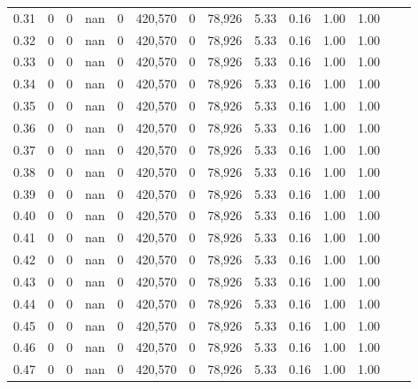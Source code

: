\begin{tabular}{rrrrrrrrrrrrrr}
0.31 &        0 &       0 &     nan &        0 &  420,570 &       0 &  78,926 &  5.33 &  0.16 &  1.00 &      1.00 \\
0.32 &        0 &       0 &     nan &        0 &  420,570 &       0 &  78,926 &  5.33 &  0.16 &  1.00 &      1.00 \\
0.33 &        0 &       0 &     nan &        0 &  420,570 &       0 &  78,926 &  5.33 &  0.16 &  1.00 &      1.00 \\
0.34 &        0 &       0 &     nan &        0 &  420,570 &       0 &  78,926 &  5.33 &  0.16 &  1.00 &      1.00 \\
0.35 &        0 &       0 &     nan &        0 &  420,570 &       0 &  78,926 &  5.33 &  0.16 &  1.00 &      1.00 \\
0.36 &        0 &       0 &     nan &        0 &  420,570 &       0 &  78,926 &  5.33 &  0.16 &  1.00 &      1.00 \\
0.37 &        0 &       0 &     nan &        0 &  420,570 &       0 &  78,926 &  5.33 &  0.16 &  1.00 &      1.00 \\
0.38 &        0 &       0 &     nan &        0 &  420,570 &       0 &  78,926 &  5.33 &  0.16 &  1.00 &      1.00 \\
0.39 &        0 &       0 &     nan &        0 &  420,570 &       0 &  78,926 &  5.33 &  0.16 &  1.00 &      1.00 \\
0.40 &        0 &       0 &     nan &        0 &  420,570 &       0 &  78,926 &  5.33 &  0.16 &  1.00 &      1.00 \\
0.41 &        0 &       0 &     nan &        0 &  420,570 &       0 &  78,926 &  5.33 &  0.16 &  1.00 &      1.00 \\
0.42 &        0 &       0 &     nan &        0 &  420,570 &       0 &  78,926 &  5.33 &  0.16 &  1.00 &      1.00 \\
0.43 &        0 &       0 &     nan &        0 &  420,570 &       0 &  78,926 &  5.33 &  0.16 &  1.00 &      1.00 \\
0.44 &        0 &       0 &     nan &        0 &  420,570 &       0 &  78,926 &  5.33 &  0.16 &  1.00 &      1.00 \\
0.45 &        0 &       0 &     nan &        0 &  420,570 &       0 &  78,926 &  5.33 &  0.16 &  1.00 &      1.00 \\
0.46 &        0 &       0 &     nan &        0 &  420,570 &       0 &  78,926 &  5.33 &  0.16 &  1.00 &      1.00 \\
0.47 &        0 &       0 &     nan &        0 &  420,570 &       0 &  78,926 &  5.33 &  0.16 &  1.00 &      1.00 \\

\end{tabular}
